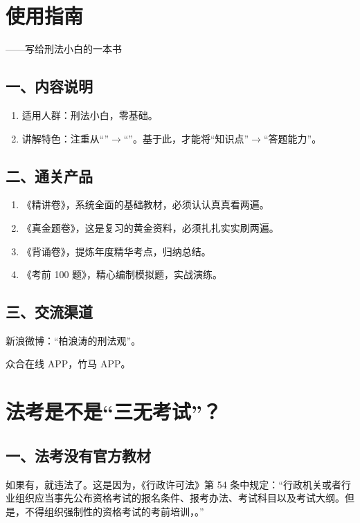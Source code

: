 \chapter*{使用指南}
\begin{flushright}——写给刑法小白的一本书\end{flushright}
\section*{一、内容说明}
\begin{enumerate}[label=\arabic*.,leftmargin=2.2em]
\item 适用人群：刑法小白，零基础。
\item 讲解特色：注重从“”$\rightarrow$“”。基于此，才能将“知识点”$\rightarrow$“答题能力”。
\end{enumerate}
\section*{二、通关产品}
\begin{enumerate}[label=\arabic*.,leftmargin=2.2em]
\item 《精讲卷》，系统全面的基础教材，必须认认真真看两遍。
\item 《真金题卷》，这是复习的黄金资料，必须扎扎实实刷两遍。
\item 《背诵卷》，提炼年度精华考点，归纳总结。
\item 《考前 100 题》，精心编制模拟题，实战演练。
\end{enumerate}
\section*{三、交流渠道}
新浪微博：“柏浪涛的刑法观”。

众合在线 APP，竹马 APP。

\chapter*{法考是不是“三无考试”？}
\section*{一、法考没有官方教材}
如果有，就违法了。这是因为，《行政许可法》第 54 条中规定：“行政机关或者行业组织应当事先公布资格考试的报名条件、报考办法、考试科目以及考试大纲。但是，不得组织强制性的资格考试的考前培训，。”

